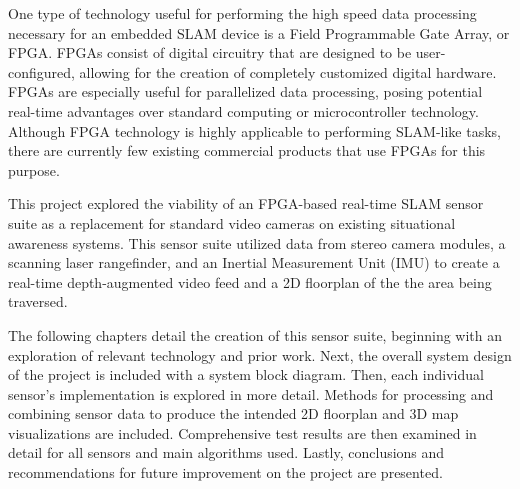\par
One type of technology useful for performing the high speed data processing necessary for an embedded SLAM device is a Field Programmable Gate Array, or FPGA. FPGAs consist of digital circuitry that are designed to be user-configured, allowing for the creation of completely customized digital hardware. FPGAs are especially useful for parallelized data processing, posing potential real-time advantages over standard computing or microcontroller technology. Although FPGA technology is highly applicable to performing SLAM-like tasks, there are currently few existing commercial products that use FPGAs for this purpose. 
\par
This project explored the viability of an FPGA-based real-time SLAM sensor suite as a replacement for standard video cameras on existing situational awareness systems. This sensor suite utilized data from stereo camera modules, a scanning laser rangefinder, and an Inertial Measurement Unit (IMU) to create a real-time depth-augmented video feed and a 2D floorplan of the the area being traversed.
\par
The following chapters detail the creation of this sensor suite, beginning with an exploration of relevant technology and prior work. Next, the overall system design of the project is included with a system block diagram. Then, each individual sensor’s implementation is explored in more detail. Methods for processing and combining sensor data to produce the intended 2D floorplan and 3D map visualizations are included. Comprehensive test results are then examined in detail for all sensors and main algorithms used. Lastly, conclusions and recommendations for future improvement on the project are presented. 
